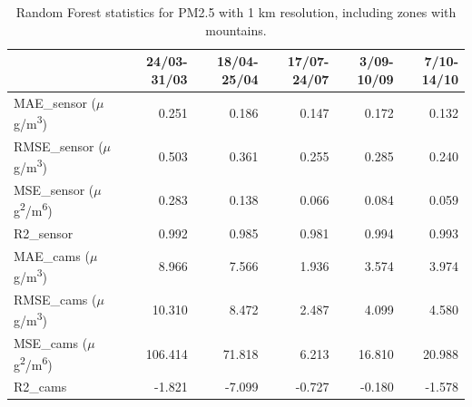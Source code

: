 \begin{table}[H]
\begin{tabular}{lrrrrr}
\toprule
 &  24/03-31/03 &  18/04-25/04 &  17/07-24/07 &  3/09-10/09 &  7/10-14/10 \\
\midrule
 MAE\_sensor ($\mu$g/m\textsuperscript{3})&        0.251 &        0.186 &        0.147 &       0.172 &       0.132 \\
RMSE\_sensor ($\mu$g/m\textsuperscript{3})&        0.503 &        0.361 &        0.255 &       0.285 &       0.240 \\
 MSE\_sensor ($\mu$g\textsuperscript{2}/m\textsuperscript{6})&        0.283 &        0.138 &        0.066 &       0.084 &       0.059 \\
  R2\_sensor &        0.992 &        0.985 &        0.981 &       0.994 &       0.993 \\
   MAE\_cams ($\mu$g/m\textsuperscript{3})&        8.966 &        7.566 &        1.936 &       3.574 &       3.974 \\
  RMSE\_cams ($\mu$g/m\textsuperscript{3})&       10.310 &        8.472 &        2.487 &       4.099 &       4.580 \\
   MSE\_cams ($\mu$g\textsuperscript{2}/m\textsuperscript{6})&      106.414 &       71.818 &        6.213 &      16.810 &      20.988 \\
    R2\_cams &       -1.821 &       -7.099 &       -0.727 &      -0.180 &      -1.578 \\
\bottomrule
\end{tabular}
\caption{Random Forest statistics for PM2.5 with 1 km resolution, including zones with mountains.}
\end{table}
